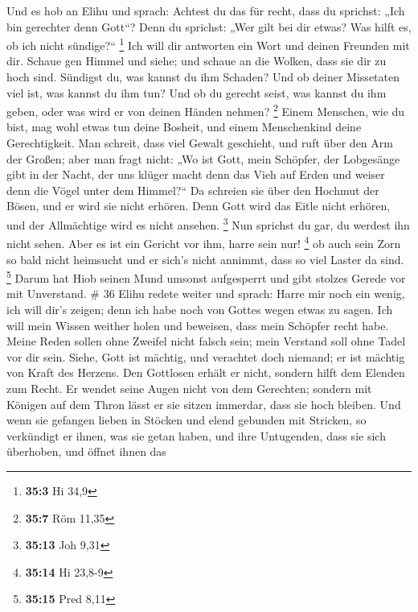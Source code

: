  Und es hob an Elihu und sprach:  Achtest du das
für recht, dass du sprichst: „Ich bin gerechter denn Gott``?
 Denn du sprichst: „Wer gilt bei dir etwas? Was hilft es, ob
ich nicht sündige?{}`` \footnote{\textbf{35:3} Hi 34,9}  Ich
will dir antworten ein Wort und deinen Freunden mit dir. 
Schaue gen Himmel und siehe; und schaue an die Wolken, dass sie dir zu
hoch sind.  Sündigst du, was kannst du ihm Schaden? Und ob
deiner Missetaten viel ist, was kannst du ihm tun?  Und ob
du gerecht seist, was kannst du ihm geben, oder was wird er von deinen
Händen nehmen? \footnote{\textbf{35:7} Röm 11,35}  Einem
Menschen, wie du bist, mag wohl etwas tun deine Bosheit, und einem
Menschenkind deine Gerechtigkeit.  Man schreit, dass viel
Gewalt geschieht, und ruft über den Arm der Großen;  aber
man fragt nicht: „Wo ist Gott, mein Schöpfer, der Lobgesänge gibt in der
Nacht,  der uns klüger macht denn das Vieh auf Erden und
weiser denn die Vögel unter dem Himmel?{}``  Da schreien
sie über den Hochmut der Bösen, und er wird sie nicht erhören.
 Denn Gott wird das Eitle nicht erhören, und der
Allmächtige wird es nicht ansehen. \footnote{\textbf{35:13} Joh 9,31}
 Nun sprichst du gar, du werdest ihn nicht sehen. Aber es
ist ein Gericht vor ihm, harre sein nur! \footnote{\textbf{35:14} Hi
  23,8-9}  ob auch sein Zorn so bald nicht heimsucht und er
sich's nicht annimmt, dass so viel Laster da sind. \footnote{\textbf{35:15}
  Pred 8,11}  Darum hat Hiob seinen Mund umsonst
aufgesperrt und gibt stolzes Gerede vor mit Unverstand. \# 36
 Elihu redete weiter und sprach:  Harre mir noch
ein wenig, ich will dir's zeigen; denn ich habe noch von Gottes wegen
etwas zu sagen.  Ich will mein Wissen weither holen und
beweisen, dass mein Schöpfer recht habe.  Meine Reden sollen
ohne Zweifel nicht falsch sein; mein Verstand soll ohne Tadel vor dir
sein.  Siehe, Gott ist mächtig, und verachtet doch niemand;
er ist mächtig von Kraft des Herzens.  Den Gottlosen erhält
er nicht, sondern hilft dem Elenden zum Recht.  Er wendet
seine Augen nicht von dem Gerechten; sondern mit Königen auf dem Thron
lässt er sie sitzen immerdar, dass sie hoch bleiben.  Und
wenn sie gefangen lieben in Stöcken und elend gebunden mit Stricken,
 so verkündigt er ihnen, was sie getan haben, und ihre
Untugenden, dass sie sich überhoben,  und öffnet ihnen das
